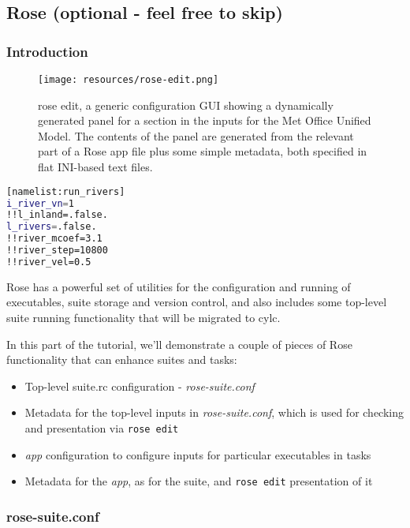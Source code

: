 \subsection{Rose (optional - feel free to skip)}
\label{Rose}

\subsubsection{Introduction}

\begin{figure}[h]
\texttt{[image: resources/rose-edit.png]}
\caption{rose edit, a generic configuration GUI showing a dynamically generated panel for a section in the inputs for the Met Office Unified Model. The contents of the panel are generated from the relevant part of a Rose app file plus some simple metadata, both specified in flat INI-based text files. \label{rose edit}}
\end{figure}

\begin{lstlisting}[mathescape, language=bash, title={rose-app.conf snippet used to drive Figure~\ref{rose edit}}]
[namelist:run_rivers]
i_river_vn=1
!!l_inland=.false.
l_rivers=.false.
!!river_mcoef=3.1
!!river_step=10800
!!river_vel=0.5
\end{lstlisting}

Rose has a powerful set of utilities for the configuration and running of executables, suite
storage and version control, and also includes some top-level suite running functionality that will be migrated to cylc.

In this part of the tutorial, we'll demonstrate a couple of pieces of Rose functionality that can enhance suites and
tasks:
\begin{itemize}
    \item{Top-level suite.rc configuration - {\em rose-suite.conf}}
    \item{Metadata for the top-level inputs in {\em rose-suite.conf}, which is used for checking and presentation via \lstinline{rose edit}}
    \item{{\em app} configuration to configure inputs for particular executables in tasks}
    \item{Metadata for the {\em app}, as for the suite, and \lstinline{rose edit} presentation of it}
\end{itemize}

\subsubsection{rose-suite.conf}


